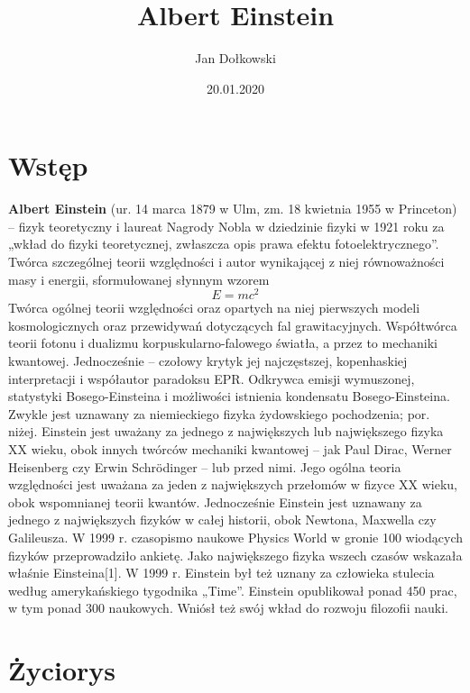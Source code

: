 \documentclass[11pt]{article}
\title{Albert Einstein}
\author{Jan Dołkowski}
\date{20.01.2020}
\begin{document}
\maketitle
\newpage
\tableofcontents
\listoftables
\listoffigures
\newpage
\section{Wstęp}
\textbf{Albert Einstein} (ur. 14 marca 1879 w Ulm, zm. 18 kwietnia 1955 w Princeton) – fizyk teoretyczny i laureat Nagrody Nobla w dziedzinie fizyki w 1921 roku za „wkład do fizyki teoretycznej, zwłaszcza opis prawa efektu fotoelektrycznego”. Twórca szczególnej teorii względności i autor wynikającej z niej równoważności masy i energii, sformułowanej słynnym wzorem {\large $$E = mc^2$$} Twórca ogólnej teorii względności oraz opartych na niej pierwszych modeli kosmologicznych oraz przewidywań dotyczących fal grawitacyjnych. Współtwórca teorii fotonu i dualizmu korpuskularno-falowego światła, a przez to mechaniki kwantowej. Jednocześnie – czołowy krytyk jej najczęstszej, kopenhaskiej interpretacji i współautor paradoksu EPR. Odkrywca emisji wymuszonej, statystyki Bosego-Einsteina i możliwości istnienia kondensatu Bosego-Einsteina. Zwykle jest uznawany za niemieckiego fizyka żydowskiego pochodzenia; por. niżej. Einstein jest uważany za jednego z największych lub największego fizyka XX wieku, obok innych twórców mechaniki kwantowej – jak Paul Dirac, Werner Heisenberg czy Erwin Schrödinger – lub przed nimi. Jego ogólna teoria względności jest uważana za jeden z największych przełomów w fizyce XX wieku, obok wspomnianej teorii kwantów. Jednocześnie Einstein jest uznawany za jednego z największych fizyków w całej historii, obok Newtona, Maxwella czy Galileusza. W 1999 r. czasopismo naukowe Physics World w gronie 100 wiodących fizyków przeprowadziło ankietę. Jako największego fizyka wszech czasów wskazała właśnie Einsteina[1]. W 1999 r. Einstein był też uznany za człowieka stulecia według amerykańskiego tygodnika „Time”. Einstein opublikował ponad 450 prac, w tym ponad 300 naukowych. Wniósł też swój wkład do rozwoju filozofii nauki.
\newpage
\section{Życiorys}
\end{document}
